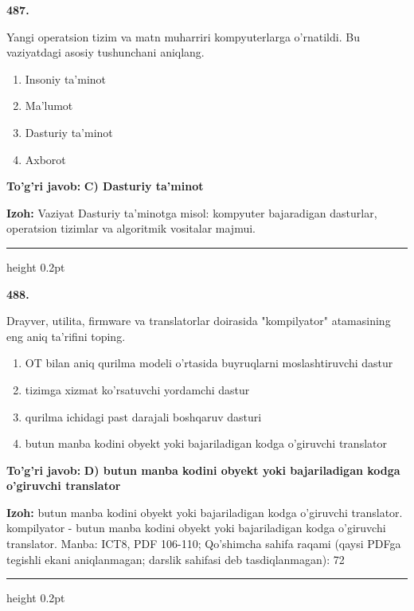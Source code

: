 \documentclass[10pt,a4paper]{article}
\begin{document}
{\bfseries\sffamily\color{ink} 487.}
\par
Yangi operatsion tizim va matn muharriri kompyuterlarga o'rnatildi. Bu vaziyatdagi asosiy tushunchani aniqlang.
\begin{enumerate}[label=\Alph*),leftmargin=9mm]
\item Insoniy ta'minot
\item Ma'lumot
\item Dasturiy ta'minot
\item Axborot
\end{enumerate}
\begin{tcolorbox}[enhanced,breakable,colback=teal!4,colframe=teal!60!black,boxrule=0.45pt,arc=1.2mm,left=2.7mm,right=2.7mm,top=1.8mm,bottom=1.8mm,before skip=2mm,after skip=2mm]
{\bfseries\sffamily\color{teal}To'g'ri javob:} \textbf{C) Dasturiy ta'minot}
\par\smallskip
{\bfseries Izoh:} Vaziyat Dasturiy ta'minotga misol: kompyuter bajaradigan dasturlar, operatsion tizimlar va algoritmik vositalar majmui.
\end{tcolorbox}
\vspace{2mm}\hrule height 0.2pt\vspace{3mm}


{\bfseries\sffamily\color{ink} 488.}
\par
Drayver, utilita, firmware va translatorlar doirasida "kompilyator" atamasining eng aniq ta'rifini toping.
\begin{enumerate}[label=\Alph*),leftmargin=9mm]
\item OT bilan aniq qurilma modeli o'rtasida buyruqlarni moslashtiruvchi dastur
\item tizimga xizmat ko'rsatuvchi yordamchi dastur
\item qurilma ichidagi past darajali boshqaruv dasturi
\item butun manba kodini obyekt yoki bajariladigan kodga o'giruvchi translator
\end{enumerate}
\begin{tcolorbox}[enhanced,breakable,colback=teal!4,colframe=teal!60!black,boxrule=0.45pt,arc=1.2mm,left=2.7mm,right=2.7mm,top=1.8mm,bottom=1.8mm,before skip=2mm,after skip=2mm]
{\bfseries\sffamily\color{teal}To'g'ri javob:} \textbf{D) butun manba kodini obyekt yoki bajariladigan kodga o'giruvchi translator}
\par\smallskip
{\bfseries Izoh:} butun manba kodini obyekt yoki bajariladigan kodga o'giruvchi translator. kompilyator - butun manba kodini obyekt yoki bajariladigan kodga o'giruvchi translator. Manba: ICT8, PDF 106-110; Qo'shimcha sahifa raqami (qaysi PDFga tegishli ekani aniqlanmagan; darslik sahifasi deb tasdiqlanmagan): 72
\end{tcolorbox}
\vspace{2mm}\hrule height 0.2pt\vspace{3mm}
\end{document}
